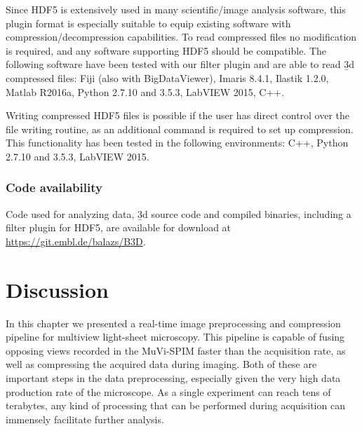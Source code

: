   Since HDF5 is extensively used in many scientific/image analysis software, this plugin format is especially suitable to equip existing software with compression/decompression capabilities. To read compressed files no modification is required, and any software supporting HDF5 should be compatible. The following software have been tested with our filter plugin and are able to read \b3d compressed files:
  Fiji (also with BigDataViewer), Imaris 8.4.1, Ilastik 1.2.0, Matlab R2016a, Python 2.7.10 and 3.5.3, LabVIEW 2015, C++.
  
  Writing compressed HDF5 files is possible if the user has direct control over the file writing routine, as an additional command is required to set up compression. This functionality has been tested in the following environments: C++, Python 2.7.10 and 3.5.3, LabVIEW 2015.

  \subsubsection{Code availability}
Code used for analyzing data, \b3d source code and compiled binaries, including a filter plugin for HDF5, are available for download at \url{https://git.embl.de/balazs/B3D}.






\section{Discussion}
\label{sec:discu-gpu}

In this chapter we presented a real-time image preprocessing and compression pipeline for multiview light-sheet microscopy. This pipeline is capable of fusing opposing views recorded in the MuVi-SPIM faster than the acquisition rate, as well as compressing the acquired data during imaging. Both of these are important steps in the data preprocessing, especially given the very high data production rate of the microscope. As a single experiment can reach tens of terabytes, any kind of processing that can be performed during acquisition can immensely facilitate further analysis.

